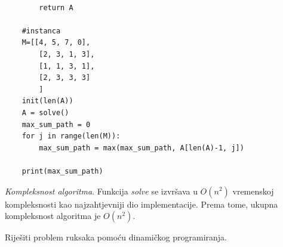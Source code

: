 \begin{solution}
\begin{verbatim}
 
		return A

	#instanca
	M=[[4, 5, 7, 0],
    	[2, 3, 1, 3],
    	[1, 1, 3, 1],
    	[2, 3, 3, 3]
        ]	
	init(len(A))
	A = solve()
	max_sum_path = 0
	for j in range(len(M)):
		max_sum_path = max(max_sum_path, A[len(A)-1, j])
		
	print(max_sum_path)
\end{verbatim}

\textit{Kompleksnost algoritma}. Funkcija \textit{solve} se izvršava u $O(n^2)$ vremenskoj kompleksnosti kao najzahtjevniji dio implementacije. Prema tome, ukupna kompleksnost algoritma je $O(n^2)$.

\end{solution}



\begin{example}
	Riješiti problem ruksaka pomoću dinamičkog programiranja. 
\end{example}

